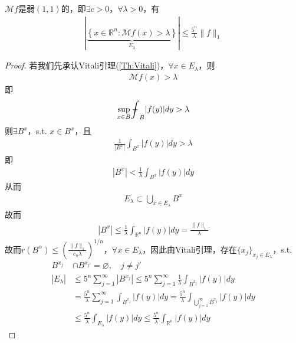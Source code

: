 \begin{theorem}
    $\mathcal{M}f$是弱$(1,1)$的，即$\exists c>0$，$\forall \lambda>0$，有
    \begin{align*}
        \left|\underbrace{\left\lbrace x\in\mathbb{R}^n: \mathcal{M}f(x) > \lambda \right\rbrace}\limits_{E_{\lambda}}\right| \leqslant \frac{5^n}{\lambda} \|f\|_1
    \end{align*}
\end{theorem}
\begin{proof}
    若我们先承认Vitali引理(\ref{Th:Vitali})，$\forall x\in E_{\lambda}$，则
    \begin{align*}
        \mathcal{M}f(x) > \lambda
    \end{align*}
    即
    \begin{align*}
        \sup\limits_{x\in B} \bbint_{B} |f(y)| dy > \lambda
    \end{align*}
    则$\exists B^x$，s.t. $x\in B^x$，且
    \begin{align*}
        \frac{1}{|B^x|}\int_{B^x} |f(y)| dy > \lambda
    \end{align*}
    即
    \begin{align*}
        |B^x| < \frac{1}{\lambda} \int_{B^x} |f(y)| dy
    \end{align*}
    从而
    \begin{align*}
        E_{\lambda} \subset \bigcup\limits_{x\in E_{\lambda}} B^x
    \end{align*}
    故而
    \begin{align*}
        |B^x| \leqslant \frac{1}{\lambda} \int_{\mathbb{R}^n} |f(y)| dy = \frac{\|f\|_1}{\lambda}
    \end{align*}
    故而$r(B^{\alpha}) \leqslant \left(\frac{\|f\|_1}{c_n \lambda}\right)^{1/n}$，$\forall x\in E_{\lambda}$，因此由Vitali引理，存在$\{x_j\}_{x_j\in E_{\lambda}}$，s.t.
    \begin{align*}
        B^{x_j} &\cap B^{x_{j'}} = \varnothing,\quad j\neq j' \\
        |E_{\lambda}| &\leqslant 5^n \sum\limits_{j=1}^{\infty} |B^{x_j}| \leqslant 5^n \sum\limits_{j=1}^{\infty} \frac{1}{\lambda} \int_{B^{x_j}} |f(y)| dy \\
        & = \frac{5^n}{\lambda} \sum_{j=1}^{\infty} \int_{B^{x_j}} |f(y)| dy = \frac{5^n}{\lambda} \int_{\bigcup\limits_{j=1}^{\infty} B^{x_j}} |f(y)| dy \\
        & \leqslant \frac{5^n}{\lambda} {\int_{E_{\lambda}}} |f(y)| dy \leqslant \frac{5^n}{\lambda} \int_{\mathbb{R}^n} |f(y)| dy
    \end{align*}
\end{proof}


